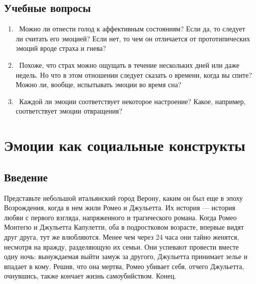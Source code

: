 \documentclass[11pt]{book}
\begin{document}
\section{Учебные вопросы}

\begin{tcolorbox}
  \begin{enumerate}
    \item\ Можно ли отнести голод к аффективным состояниям? Если да, то следует ли считать его эмоцией? Если нет, то чем он отличается от прототипических эмоций вроде страха и гнева?
    \item\ Похоже, что страх можно ощущать в течение нескольких дней или даже недель. Но что в этом отношении следует сказать о времени, когда вы спите? Можно ли, вообще, испытывать эмоции во время сна?
    \item\ Каждой ли эмоции соответствует некоторое настроение? Какое, например, соответствует эмоции отвращения?
  \end{enumerate}
\end{tcolorbox}

\chapter{Эмоции как социальные конструкты}

\section{Введение}

Представьте небольшой итальянский город Верону, каким он был еще в эпоху Возрождения, когда в нем жили Ромео и Джульетта. Их история --- история любви с первого взгляда, напряженного и трагического романа. Когда Ромео Монтегю и Джульетта Капулетти, оба в подростковом возрасте, впервые видят друг друга, тут же влюбляются. Менее чем через 24 часа они тайно женятся, несмотря на вражду, разделяющую их семьи. Они успевают провести вместе одну ночь: вынуждаемая выйти замуж за другого, Джульетта принимает зелье и впадает в кому. Решив, что она мертва, Ромео убивает себя, отчего Джульетта, очнувшись, также кончает жизнь самоубийством. Конец.
\end{document}
